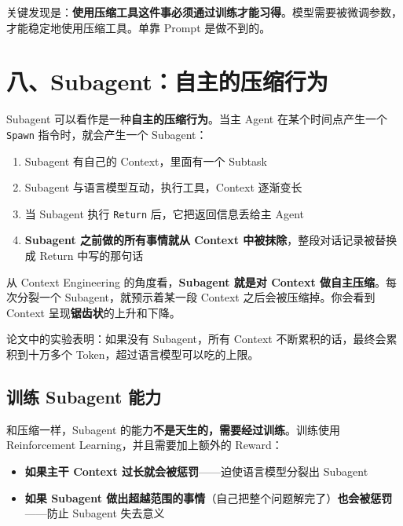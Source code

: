 \documentclass[12pt,a4paper]{article}
\begin{document}
关键发现是：\textbf{使用压缩工具这件事必须通过训练才能习得}。模型需要被微调参数，才能稳定地使用压缩工具。单靠 Prompt 是做不到的。

\section{八、Subagent：自主的压缩行为}

Subagent 可以看作是一种\textbf{自主的压缩行为}。当主 Agent 在某个时间点产生一个 \texttt{Spawn} 指令时，就会产生一个 Subagent：

\begin{enumerate}[leftmargin=2em]
  \item Subagent 有自己的 Context，里面有一个 Subtask
  \item Subagent 与语言模型互动，执行工具，Context 逐渐变长
  \item 当 Subagent 执行 \texttt{Return} 后，它把返回信息丢给主 Agent
  \item \textbf{Subagent 之前做的所有事情就从 Context 中被抹除}，整段对话记录被替换成 Return 中写的那句话
\end{enumerate}

从 Context Engineering 的角度看，\textbf{Subagent 就是对 Context 做自主压缩}。每次分裂一个 Subagent，就预示着某一段 Context 之后会被压缩掉。你会看到 Context 呈现\textbf{锯齿状}的上升和下降。

论文中的实验表明：如果没有 Subagent，所有 Context 不断累积的话，最终会累积到十万多个 Token，超过语言模型可以吃的上限。

\subsection{训练 Subagent 能力}

和压缩一样，Subagent 的能力\textbf{不是天生的，需要经过训练}。训练使用 Reinforcement Learning，并且需要加上额外的 Reward：

\begin{itemize}[leftmargin=2em]
  \item \textbf{如果主干 Context 过长就会被惩罚}——迫使语言模型分裂出 Subagent
  \item \textbf{如果 Subagent 做出超越范围的事情}（自己把整个问题解完了）\textbf{也会被惩罚}——防止 Subagent 失去意义
\end{itemize}

\end{document}
